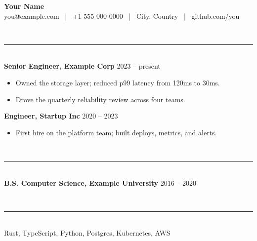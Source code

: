 \documentclass[11pt]{article}
\newcommand{\sect}[1]{\vspace{10pt}{\large\bfseries #1}\\[-7pt]\rule{\linewidth}{0.4pt}\\[3pt]}
\begin{document}
\begin{center}
{\LARGE\bfseries Your Name}\\[3pt]
{\small you@example.com \, | \, +1 555 000 0000 \, | \, City, Country \, | \, github.com/you}
\end{center}

\sect{Experience}
\textbf{Senior Engineer, Example Corp} \hfill 2023 -- present
\begin{itemize}
  \item Owned the storage layer; reduced p99 latency from 120ms to 30ms.
  \item Drove the quarterly reliability review across four teams.
\end{itemize}

\textbf{Engineer, Startup Inc} \hfill 2020 -- 2023
\begin{itemize}
  \item First hire on the platform team; built deploys, metrics, and alerts.
\end{itemize}

\sect{Education}
\textbf{B.S. Computer Science, Example University} \hfill 2016 -- 2020

\sect{Skills}
Rust, TypeScript, Python, Postgres, Kubernetes, AWS
\end{document}
